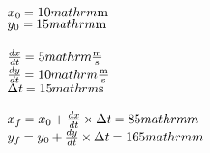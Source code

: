 \documentclass{article}
\begin{document}
\\$x_0=10\\mathrm{\mathrm{m}}$\\
$y_0=15\\mathrm{\mathrm{m}}$\\
\\$\frac{dx}{dt}=5\\mathrm{\mathrm{\frac{\mathrm{m}}{\mathrm{s}}}}$\\
$\frac{dy}{dt}=10\\mathrm{\mathrm{\frac{\mathrm{m}}{\mathrm{s}}}}$\\
$\Delta{t}=15\\mathrm{\mathrm{s}}$\\
\\$x_f=x_0+\frac{dx}{dt}\times\Delta{t}=85\\mathrm{m\,}$\\
$y_f=y_0+\frac{dy}{dt}\times\Delta{t}=165\\mathrm{m\,}$\\
\end{document}
